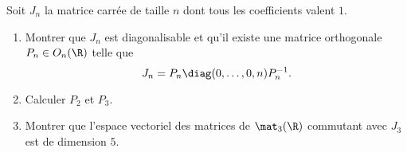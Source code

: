 \begin{enonce}
\begin{exercise}[ID={RMS133 E969},subtitle={Mines-Ponts PSI 2022},tags={},difficulty={}]
Soit $J_n$ la matrice carrée de taille $n$ dont tous les coefficients valent $1$.
\begin{enumerate}
  \item Montrer que $J_n$ est diagonalisable et qu'il existe une matrice orthogonale $P_n\in O_n(\R)$ telle que 
    \begin{equation*}
    J_n = P_n \diag(0,\dots,0,n) P_n^{-1}.
    \end{equation*}

  \item Calculer $P_2$ et $P_3$.

  \item Montrer que l'espace vectoriel des matrices de $\mat_3(\R)$ commutant avec $J_3$ est de dimension $5$.
\end{enumerate}
\end{exercise}
\begin{solution}
\end{solution}
\end{enonce}

